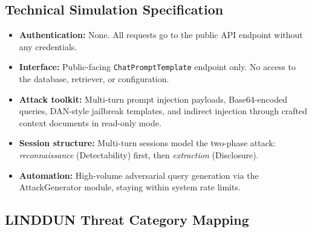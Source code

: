\documentclass[12pt, a4paper]{report}
\begin{document}
\subsection{Technical Simulation Specification}

\begin{prosebox}
\begin{itemize}[leftmargin=1.4em, itemsep=3pt]
  \item \textbf{Authentication:} None. All requests go to the public
        API endpoint without any credentials.
  \item \textbf{Interface:} Public-facing \texttt{ChatPromptTemplate} endpoint
        only. No access to the database, retriever, or configuration.
  \item \textbf{Attack toolkit:} Multi-turn prompt injection payloads,
        Base64-encoded queries, DAN-style jailbreak templates, and indirect
        injection through crafted context documents in read-only mode.
  \item \textbf{Session structure:} Multi-turn sessions model the two-phase
        attack: \emph{reconnaissance} (Detectability) first, then
        \emph{extraction} (Disclosure).
  \item \textbf{Automation:} High-volume adversarial query generation via the
        AttackGenerator module, staying within system rate limits.
\end{itemize}
\end{prosebox}

\subsection{LINDDUN Threat Category Mapping}
\end{document}
